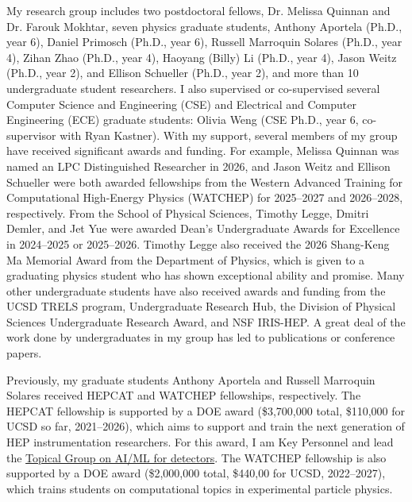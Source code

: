 \documentclass[11pt,letterpaper,notitlepage]{article}
\newcommand{\mycite}[1]{%
\ifthenelse{\equal{#1}{Khachatryan:2015pwa}}{\href{https://doi.org/10.1103/PhysRevD.91.052018}{\textbf{A.I.277}}}{}%
\ifthenelse{\equal{#1}{Anderson:2015tia}}{\href{https://doi.org/10.1016/j.nima.2014.11.041}{\textbf{A.I.311}}}{}%
\ifthenelse{\equal{#1}{Anderson:2015gha}}{\href{https://doi.org/10.1016/j.nima.2015.04.013}{\textbf{A.I.317}}}{}%
\ifthenelse{\equal{#1}{Anderson:2016ygg}}{\href{https://doi.org/10.1109/TNS.2016.2528166}{\textbf{A.I.373}}}{}%
\ifthenelse{\equal{#1}{Anderson:2016tiu}}{\href{https://doi.org/10.1016/j.nima.2015.11.129}{\textbf{A.I.396}}}{}%
\ifthenelse{\equal{#1}{Khachatryan:2016epu}}{\href{https://doi.org/10.1103/PhysRevD.95.012003}{\textbf{A.I.444}}}{}%
\ifthenelse{\equal{#1}{Sirunyan:2016iap}}{\href{https://doi.org/10.1016/j.physletb.2017.02.012}{\textbf{A.I.491}}}{}%
\ifthenelse{\equal{#1}{Sirunyan:2017nvi}}{\href{https://doi.org/10.1007/JHEP01(2018)097}{\textbf{A.I.567}}}{}%
\ifthenelse{\equal{#1}{Sirunyan:2017dgc}}{\href{https://doi.org/10.1103/PhysRevLett.120.071802}{\textbf{A.I.571}}}{}%
\ifthenelse{\equal{#1}{Sirunyan:2017eie}}{\href{https://doi.org/10.1016/j.physletb.2017.12.069}{\textbf{A.I.604}}}{}%
\ifthenelse{\equal{#1}{Duarte:2018ite}}{\href{https://doi.org/10.1088/1748-0221/13/07/P07027}{\textbf{A.I.644}}}{}%
\ifthenelse{\equal{#1}{Sirunyan:2018xlo}}{\href{https://doi.org/10.1007/JHEP08(2018)130}{\textbf{A.I.662}}}{}%
\ifthenelse{\equal{#1}{Sirunyan:2018kst}}{\href{https://doi.org/10.1103/PhysRevLett.121.121801}{\textbf{A.I.667}}}{}%
\ifthenelse{\equal{#1}{Sirunyan:2018ikr}}{\href{https://doi.org/10.1103/PhysRevD.99.012005}{\textbf{A.I.713}}}{}%
\ifthenelse{\equal{#1}{Sirunyan:2018koj}}{\href{https://doi.org/10.1140/epjc/s10052-019-6909-y}{\textbf{A.I.761}}}{}%
\ifthenelse{\equal{#1}{Sirunyan:2018sgc}}{\href{https://doi.org/10.1016/j.physletb.2019.03.059}{\textbf{A.I.762}}}{}%
\ifthenelse{\equal{#1}{Duarte:2019fta}}{\href{https://doi.org/10.1007/s41781-019-0027-2}{\textbf{A.I.794}}}{}%
\ifthenelse{\equal{#1}{Sirunyan:2019vxa}}{\href{https://doi.org/10.1103/PhysRevD.100.112007}{\textbf{A.I.817}}}{}%
\ifthenelse{\equal{#1}{Sirunyan:2019sgo}}{\href{https://doi.org/10.1103/PhysRevLett.123.231803}{\textbf{A.I.818}}}{}%
\ifthenelse{\equal{#1}{Moreno:2019bmu}}{\href{https://doi.org/10.1140/epjc/s10052-020-7608-4}{\textbf{A.I.824}}}{}%
\ifthenelse{\equal{#1}{Summers:2020xiy}}{\href{https://doi.org/10.1088/1748-0221/15/05/p05026}{\textbf{A.I.861}}}{}%
\ifthenelse{\equal{#1}{Sirunyan:2019vgj}}{\href{https://doi.org/10.1007/JHEP05(2020)033}{\textbf{A.I.866}}}{}%
\ifthenelse{\equal{#1}{Sirunyan:2019pnb}}{\href{https://doi.org/10.1016/j.physletb.2020.135448}{\textbf{A.I.875}}}{}%
\ifthenelse{\equal{#1}{Moreno:2019neq}}{\href{https://doi.org/10.1103/PhysRevD.102.012010}{\textbf{A.I.877}}}{}%
\ifthenelse{\equal{#1}{DiGuglielmo:2020eqx}}{\href{https://doi.org/10.1088/2632-2153/aba042}{\textbf{A.I.910}}}{}%
\ifthenelse{\equal{#1}{Sirunyan:2020hwz}}{\href{https://doi.org/10.1007/JHEP12(2020)085}{\textbf{A.I.911}}}{}%
\ifthenelse{\equal{#1}{Iiyama:2020wap}}{\href{https://doi.org/10.3389/fdata.2020.598927}{\textbf{A.I.915}}}{}%
\ifthenelse{\equal{#1}{Krupa:2020bwg}}{\href{https://doi.org/10.1088/2632-2153/abec21}{\textbf{A.I.930}}}{}%
\ifthenelse{\equal{#1}{Pata:2021oez}}{\href{https://doi.org/10.1140/epjc/s10052-021-09158-w}{\textbf{A.I.939}}}{}%
\ifthenelse{\equal{#1}{Aarrestad:2021zos}}{\href{https://doi.org/10.1088/2632-2153/ac0ea1}{\textbf{A.I.944}}}{}%
\ifthenelse{\equal{#1}{Hawks:2021ruw}}{\href{https://doi.org/10.3389/frai.2021.676564}{\textbf{A.I.948}}}{}%
\ifthenelse{\equal{#1}{DiGuglielmo:2021ide}}{\href{https://doi.org/10.1109/TNS.2021.3087100}{\textbf{A.I.951}}}{}%
\ifthenelse{\equal{#1}{John:2020sak}}{\href{https://doi.org/10.1103/PhysRevAccelBeams.24.104601}{\textbf{A.I.971}}}{}%
\ifthenelse{\equal{#1}{Dezoort:2021kfk}}{\href{https://doi.org/10.1007/s41781-021-00073-z}{\textbf{A.I.974}}}{}%
\ifthenelse{\equal{#1}{Zlokapa:2019tkn}}{\href{https://doi.org/10.1007/s42484-021-00054-w}{\textbf{A.I.975}}}{}%
\ifthenelse{\equal{#1}{CMS:2021juv}}{\href{https://doi.org/10.1103/PhysRevLett.127.261804}{\textbf{A.I.987}}}{}%
\ifthenelse{\equal{#1}{Kasieczka:2021xcg}}{\href{https://doi.org/10.1088/1361-6633/ac36b9}{\textbf{A.I.988}}}{}%
\ifthenelse{\equal{#1}{Aarrestad:2021oeb}}{\href{https://doi.org/10.21468/SciPostPhys.12.1.043}{\textbf{A.I.992}}}{}%
\ifthenelse{\equal{#1}{Chen:2021euv}}{\href{https://doi.org/10.1038/s41597-021-01109-0}{\textbf{A.I.993}}}{}%
\ifthenelse{\equal{#1}{Govorkova:2021utb}}{\href{https://doi.org/10.1038/s42256-022-00441-3}{\textbf{A.I.994}}}{}%
\ifthenelse{\equal{#1}{Jawahar:2021vyu}}{\href{https://doi.org/10.3389/fdata.2022.803685}{\textbf{A.I.996}}}{}%
\ifthenelse{\equal{#1}{Elabd:2021lgo}}{\href{https://doi.org/10.3389/fdata.2022.828666}{\textbf{A.I.1004}}}{}%
\ifthenelse{\equal{#1}{CMS:2021yhb}}{\href{https://doi.org/10.1007/JHEP03(2022)160}{\textbf{A.I.1006}}}{}%
\ifthenelse{\equal{#1}{CMS:2022nmn}}{\href{https://doi.org/10.1103/PhysRevLett.131.041803}{\textbf{A.I.1028}}}{}%
\ifthenelse{\equal{#1}{CMS:2022dwd}}{\href{https://doi.org/10.1038/s41586-022-04892-x}{\textbf{A.I.1029}}}{}%
\ifthenelse{\equal{#1}{Touranakou:2022qrp}}{\href{https://doi.org/10.1088/2632-2153/ac7c56}{\textbf{A.I.1030}}}{}%
\ifthenelse{\equal{#1}{Kansal:2022spb}}{\href{https://doi.org/10.1103/PhysRevD.107.076017}{\textbf{A.I.1046}}}{}%
\ifthenelse{\equal{#1}{Bhimij:2022xyn}}{\href{https://doi.org/10.1007/s41781-023-00097-7}{\textbf{A.I.1047}}}{}%
\ifthenelse{\equal{#1}{Hao:2022zns}}{\href{https://doi.org/10.1140/epjc/s10052-023-11633-5}{\textbf{A.I.1052}}}{}%
\ifthenelse{\equal{#1}{Huerta:2022kgj}}{\href{https://doi.org/10.1038/s41597-023-02298-6}{\textbf{A.I.1057}}}{}%
\ifthenelse{\equal{#1}{CMS:2022wqf}}{\href{https://doi.org/10.1103/PhysRevLett.131.041801}{\textbf{A.I.1073}}}{}%
\ifthenelse{\equal{#1}{CMS:2022wjc}}{\href{https://doi.org/10.1007/JHEP07(2023)210}{\textbf{A.I.1078}}}{}%
\ifthenelse{\equal{#1}{Kansal:2023joss}}{\href{https://doi.org/10.21105/joss.05789}{\textbf{A.I.1112}}}{}%
\ifthenelse{\equal{#1}{Orzari:2023zrh}}{\href{https://doi.org/10.1088/2632-2153/ad04ea}{\textbf{A.I.1113}}}{}%
\ifthenelse{\equal{#1}{Shenoy:2023ros}}{\href{https://doi.org/10.1088/2632-2153/ad1139}{\textbf{A.I.1126}}}{}%
\ifthenelse{\equal{#1}{Duarte:2022job}}{\href{https://doi.org/10.1088/2632-2153/ad12e3}{\textbf{A.I.1127}}}{}%
\ifthenelse{\equal{#1}{Weng:2023tailor}}{\href{https://doi.org/10.1145/3624990}{\textbf{A.I.1140}}}{}%
\ifthenelse{\equal{#1}{Black:2022cth}}{\href{https://doi.org/10.1088/1748-0221/19/02/T02015}{\textbf{A.I.1142}}}{}%
\ifthenelse{\equal{#1}{CMS:2024twn}}{\href{https://doi.org/10.1007/s41781-024-00124-1}{\textbf{A.I.1144}}}{}%
\ifthenelse{\equal{#1}{CMS:2024bvl}}{\href{https://doi.org/10.1103/PhysRevD.110.032007}{\textbf{A.I.1145}}}{}%
\ifthenelse{\equal{#1}{Pata:2023rhh}}{\href{https://doi.org/10.1038/s42005-024-01599-5}{\textbf{A.I.1155}}}{}%
\ifthenelse{\equal{#1}{Campos:2023pkp}}{\href{https://doi.org/10.1145/3662000}{\textbf{A.I.1168}}}{}%
\ifthenelse{\equal{#1}{Weng:2024fkeras}}{\href{https://doi.org/10.1145/3665334}{\textbf{A.I.1178}}}{}%
\ifthenelse{\equal{#1}{CMS:2024ake}}{\href{https://doi.org/10.1103/PhysRevD.110.012004}{\textbf{A.I.1181}}}{}%
\ifthenelse{\equal{#1}{Odagiu:2024bkp}}{\href{https://doi.org/10.1088/2632-2153/ad5f10}{\textbf{A.I.1183}}}{}%
\ifthenelse{\equal{#1}{Brigljevic:2024vuv}}{\href{https://doi.org/10.1140/epjc/s10052-024-13376-3}{\textbf{A.I.1222}}}{}%
\ifthenelse{\equal{#1}{CMS:2024ddc}}{\href{https://doi.org/10.1007/JHEP12(2024)035}{\textbf{A.I.1229}}}{}%
\ifthenelse{\equal{#1}{CMS:2024zqs}}{\href{https://doi.org/10.1016/j.physrep.2024.09.013}{\textbf{A.I.1260}}}{}%
\ifthenelse{\equal{#1}{CMS:2024zhe}}{\href{https://doi.org/10.1016/j.physrep.2024.09.006}{\textbf{A.I.1262}}}{}%
\ifthenelse{\equal{#1}{Mokhtar:2025zqs}}{\href{https://doi.org/10.1103/PhysRevD.111.092015}{\textbf{A.I.1276}}}{}%
\ifthenelse{\equal{#1}{Zhao:2025daw}}{\href{https://doi.org/10.1088/1748-0221/20/06/P06002}{\textbf{A.I.1286}}}{}%
\ifthenelse{\equal{#1}{Weitz:2025tcj}}{\href{https://doi.org/10.1088/2632-2153/adede1}{\textbf{A.I.1288}}}{}%
\ifthenelse{\equal{#1}{Tsoi:2024pbn}}{\href{https://doi.org/10.1007/s41781-025-00140-9}{\textbf{A.I.1293}}}{}%
\ifthenelse{\equal{#1}{Li:2024qfq}}{\href{https://doi.org/10.1007/JHEP11(2025)119}{\textbf{A.I.1321}}}{}%
\ifthenelse{\equal{#1}{CMS:2025rtd}}{\href{https://doi.org/10.1103/7ldn-snzn}{\textbf{A.I.1337}}}{}%
\ifthenelse{\equal{#1}{CMS:2026znb}}{\href{https://arxiv.org/abs/2601.17554}{\textbf{A.I.1352}}}{}%
\ifthenelse{\equal{#1}{Schulte:2025mai}}{\href{https://doi.org/10.1145/3801979}{\textbf{A.I.1365}}}{}%
\ifthenelse{\equal{#1}{Hawks:2025hew}}{\href{https://doi.org/10.1145/3787490}{\textbf{A.I.1375}}}{}%
\ifthenelse{\equal{#1}{CMS:2026shw}}{\href{https://arxiv.org/abs/2602.00273}{\textbf{A.I.1377}}}{}%
\ifthenelse{\equal{#1}{Deiana:2021niw}}{\href{https://doi.org/10.3389/fdata.2022.787421}{\textbf{A.II.1}}}{}%
\ifthenelse{\equal{#1}{Duarte:2022efficient}}{\href{https://doi.org/10.3389/frai.2022.999173}{\textbf{A.II.2}}}{}%
\ifthenelse{\equal{#1}{Chien:2024gnn}}{\href{https://doi.org/10.1038/s44287-024-00076-z}{\textbf{A.II.3}}}{}%
\ifthenelse{\equal{#1}{Duarte:2025qbk}}{\href{https://doi.org/10.1142/S0217751X26300115}{\textbf{A.II.4}}}{}%
\ifthenelse{\equal{#1}{Duarte:2020ngm}}{\href{https://doi.org/10.1142/9789811234033_0012}{\textbf{A.III.1}}}{}%
\ifthenelse{\equal{#1}{Duarte:2024xkc}}{\href{https://doi.org/10.1142/9789819801107_0005}{\textbf{A.III.2}}}{}%
\ifthenelse{\equal{#1}{neurips2019_sonic}}{\href{https://doi.org/10.5281/zenodo.3895029}{\textbf{A.IV.1}}}{}%
\ifthenelse{\equal{#1}{neurips2019_hbb}}{\href{https://doi.org/10.5281/zenodo.3895048}{\textbf{A.IV.2}}}{}%
\ifthenelse{\equal{#1}{neurips2019_hls4ml}}{\href{https://doi.org/10.5281/zenodo.3895081}{\textbf{A.IV.3}}}{}%
\ifthenelse{\equal{#1}{Rankin:2020usv}}{\href{https://doi.org/10.1109/H2RC51942.2020.00010}{\textbf{A.IV.4}}}{}%
\ifthenelse{\equal{#1}{Heintz:2020soy}}{\href{https://arxiv.org/abs/2012.01563}{\textbf{A.IV.5}}}{}%
\ifthenelse{\equal{#1}{Kansal:2020svm}}{\href{https://arxiv.org/abs/2012.00173}{\textbf{A.IV.6}}}{}%
\ifthenelse{\equal{#1}{Fahim:2021cic}}{\href{https://arxiv.org/abs/2103.05579}{\textbf{A.IV.7}}}{}%
\ifthenelse{\equal{#1}{Orzari:2021suh}}{\href{https://arxiv.org/abs/2109.15197}{\textbf{A.IV.8}}}{}%
\ifthenelse{\equal{#1}{Mokhtar:2021bkf}}{\href{https://arxiv.org/abs/2111.12840}{\textbf{A.IV.9}}}{}%
\ifthenelse{\equal{#1}{Banbury:2021mlperf}}{\href{https://arxiv.org/abs/2106.07597}{\textbf{A.IV.10}}}{}%
\ifthenelse{\equal{#1}{Kansal:2021cqp}}{\href{https://arxiv.org/abs/2106.11535}{\textbf{A.IV.11}}}{}%
\ifthenelse{\equal{#1}{Tsan:2021brw}}{\href{https://arxiv.org/abs/2111.12849}{\textbf{A.IV.12}}}{}%
\ifthenelse{\equal{#1}{Pata:2022wam}}{\href{https://doi.org/10.1088/1742-6596/2438/1/012100}{\textbf{A.IV.13}}}{}%
\ifthenelse{\equal{#1}{Borras:2022opensource}}{\href{https://arxiv.org/abs/2206.11791}{\textbf{A.IV.14}}}{}%
\ifthenelse{\equal{#1}{Pappalardo:2022nxk}}{\href{https://arxiv.org/abs/2206.07527}{\textbf{A.IV.15}}}{}%
\ifthenelse{\equal{#1}{Duarte:2022hdp}}{\href{https://arxiv.org/abs/2207.07958}{\textbf{A.IV.16}}}{}%
\ifthenelse{\equal{#1}{Mokhtar:2022pwm}}{\href{https://arxiv.org/abs/2211.09912}{\textbf{A.IV.17}}}{}%
\ifthenelse{\equal{#1}{Hussain:2022faststamp}}{\href{https://doi.org/10.1145/3508352.3549357}{\textbf{A.IV.18}}}{}%
\ifthenelse{\equal{#1}{McDermott:2023neural}}{\href{https://arxiv.org/abs/2312.05978}{\textbf{A.IV.19}}}{}%
\ifthenelse{\equal{#1}{Mokhtar:2023fzl}}{\href{https://doi.org/10.1088/1742-6596/3206/1/012099}{\textbf{A.IV.20}}}{}%
\ifthenelse{\equal{#1}{Huang:2023bny}}{\href{https://doi.org/10.1109/FPL60245.2023.00050}{\textbf{A.IV.21}}}{}%
\ifthenelse{\equal{#1}{Amaro:2023voyager}}{\href{https://doi.org/10.1145/3569951.3597597}{\textbf{A.IV.22}}}{}%
\ifthenelse{\equal{#1}{Li:2023xhj}}{\href{https://arxiv.org/abs/2312.04757}{\textbf{A.IV.23}}}{}%
\ifthenelse{\equal{#1}{Miao:2024oqy}}{\href{https://arxiv.org/abs/2402.12535}{\textbf{A.IV.24}}}{}%
\ifthenelse{\equal{#1}{Baldi:2024reliable}}{\href{https://doi.org/10.1109/VTS60656.2024.10538639}{\textbf{A.IV.25}}}{}%
\ifthenelse{\equal{#1}{Zhao:2024kry}}{\href{https://arxiv.org/abs/2408.09343}{\textbf{A.IV.26}}}{}%
\ifthenelse{\equal{#1}{Bhatnagar:2024fkx}}{\href{https://arxiv.org/abs/2412.03673}{\textbf{A.IV.27}}}{}%
\ifthenelse{\equal{#1}{Katel:2024ygn}}{\href{https://arxiv.org/abs/2412.05333}{\textbf{A.IV.28}}}{}%
\ifthenelse{\equal{#1}{Weng:2025amigolut}}{\href{https://doi.org/10.1145/3706628.3708874}{\textbf{A.IV.29}}}{}%
\ifthenelse{\equal{#1}{Kondratyev:2025jfj}}{\href{https://doi.org/10.1145/3708035.3736049}{\textbf{A.IV.30}}}{}%
\ifthenelse{\equal{#1}{Hao:2025abk}}{\href{https://arxiv.org/abs/2509.07486}{\textbf{A.IV.31}}}{}%
\ifthenelse{\equal{#1}{Govil:2025nvy}}{\href{https://arxiv.org/abs/2510.07594}{\textbf{A.IV.32}}}{}%
\ifthenelse{\equal{#1}{Legge:2025cnm}}{\href{https://arxiv.org/abs/2512.00210}{\textbf{A.IV.33}}}{}%
\ifthenelse{\equal{#1}{Weitz:2025dia}}{\href{https://arxiv.org/abs/2512.15998}{\textbf{A.IV.34}}}{}%
\ifthenelse{\equal{#1}{Weitz:2026xsv}}{\href{https://arxiv.org/abs/2605.16138}{\textbf{A.IV.35}}}{}%
\ifthenelse{\equal{#1}{Duarte:2014soa}}{\href{https://arxiv.org/abs/1409.4466}{\textbf{B.I.1}}}{}%
\ifthenelse{\equal{#1}{Bornheim_2015}}{\href{https://doi.org/10.1088/1742-6596/587/1/012057}{\textbf{B.I.2}}}{}%
\ifthenelse{\equal{#1}{7581887}}{\href{https://doi.org/10.1109/NSSMIC.2015.7581887}{\textbf{B.I.3}}}{}%
\ifthenelse{\equal{#1}{Duarte:2016wnw}}{\href{https://doi.org/10.1016/j.nuclphysbps.2015.09.071}{\textbf{B.I.4}}}{}%
\ifthenelse{\equal{#1}{8069874}}{\href{https://doi.org/10.1109/NSSMIC.2016.8069874}{\textbf{B.I.5}}}{}%
\ifthenelse{\equal{#1}{Bornheim:2017gql}}{\href{https://doi.org/10.1088/1742-6596/928/1/012023}{\textbf{B.I.6}}}{}%
\ifthenelse{\equal{#1}{Duarte:2018bsd}}{\href{https://arxiv.org/abs/1808.00902}{\textbf{B.I.7}}}{}%
\ifthenelse{\equal{#1}{Albertsson:2018maf}}{\href{https://doi.org/10.1088/1742-6596/1085/2/022008}{\textbf{B.I.8}}}{}%
\ifthenelse{\equal{#1}{Aarrestad:2020ngo}}{\href{https://doi.org/10.5281/zenodo.4009114}{\textbf{B.I.9}}}{}%
\ifthenelse{\equal{#1}{Wozniak:2020}}{\href{https://doi.org/10.1051/epjconf/202024506039}{\textbf{B.I.10}}}{}%
\ifthenelse{\equal{#1}{Thais:2022iok}}{\href{https://arxiv.org/abs/2203.12852}{\textbf{B.I.11}}}{}%
\ifthenelse{\equal{#1}{Harris:2022qtm}}{\href{https://arxiv.org/abs/2203.16255}{\textbf{B.I.12}}}{}%
\ifthenelse{\equal{#1}{Apresyan:2022tqw}}{\href{https://arxiv.org/abs/2203.07353}{\textbf{B.I.13}}}{}%
\ifthenelse{\equal{#1}{Benelli:2022sqn}}{\href{https://arxiv.org/abs/2207.09060}{\textbf{B.I.14}}}{}%
\ifthenelse{\equal{#1}{Dawson:2022zbb}}{\href{https://arxiv.org/abs/2209.07510}{\textbf{B.I.15}}}{}%
\ifthenelse{\equal{#1}{Shanahan:2022ifi}}{\href{https://arxiv.org/abs/2209.07559}{\textbf{B.I.16}}}{}%
\ifthenelse{\equal{#1}{Agarwal:2023rwr}}{\href{https://arxiv.org/abs/2306.08106}{\textbf{B.I.17}}}{}%
\ifthenelse{\equal{#1}{Li:2024xpw}}{\href{https://doi.org/10.1051/epjconf/202429509017}{\textbf{B.I.18}}}{}%
\ifthenelse{\equal{#1}{Duarte:2024lsg}}{\href{https://doi.org/10.22323/1.476.0012}{\textbf{B.I.19}}}{}%
\ifthenelse{\equal{#1}{Duarte:2017bbq}}{\href{https://arxiv.org/abs/1703.06544}{\textbf{B.IV.1}}}{}%
\ifthenelse{\equal{#1}{CMS-DP-2018-046}}{\href{https://cds.cern.ch/record/2630438}{\textbf{B.IV.2}}}{}%
\ifthenelse{\equal{#1}{CMS-PAS-EXO-17-026}}{\href{https://cds.cern.ch/record/2637847}{\textbf{B.IV.3}}}{}%
\ifthenelse{\equal{#1}{CERN-LHCC-2020-004}}{\href{https://cds.cern.ch/record/2714892}{\textbf{B.IV.4}}}{}%
\ifthenelse{\equal{#1}{hls4ml}}{\href{https://doi.org/10.5281/zenodo.1201549}{\textbf{B.IV.5}}}{}%
\ifthenelse{\equal{#1}{CMS-DP-2021-030}}{\href{https://cds.cern.ch/record/2792320}{\textbf{B.IV.6}}}{}%
\ifthenelse{\equal{#1}{CMS-PAS-HIG-21-012}}{\href{https://cds.cern.ch/record/2809929}{\textbf{B.IV.7}}}{}%
\ifthenelse{\equal{#1}{CMS-DP-2022-041}}{\href{https://cds.cern.ch/record/2839736}{\textbf{B.IV.8}}}{}%
\ifthenelse{\equal{#1}{CMS-DP-2022-061}}{\href{https://cds.cern.ch/record/2842375}{\textbf{B.IV.9}}}{}%
\ifthenelse{\equal{#1}{CMS-DP-2023-037}}{\href{https://cds.cern.ch/record/2863316}{\textbf{B.IV.10}}}{}%
\ifthenelse{\equal{#1}{CMS-PAS-HIG-21-020}}{\href{https://cds.cern.ch/record/2866501}{\textbf{B.IV.11}}}{}%
\ifthenelse{\equal{#1}{CMS-DP-2023-079}}{\href{https://cds.cern.ch/record/2876546}{\textbf{B.IV.12}}}{}%
\ifthenelse{\equal{#1}{Weng:2024architectural}}{\href{https://arxiv.org/abs/2403.08980}{\textbf{B.IV.13}}}{}%
\ifthenelse{\equal{#1}{CMS-PAS-HIG-23-012}}{\href{https://cds.cern.ch/record/2904879}{\textbf{B.IV.14}}}{}%
\ifthenelse{\equal{#1}{CMS-PAS-EXO-24-007}}{\href{https://cds.cern.ch/record/2904945}{\textbf{B.IV.15}}}{}%
\ifthenelse{\equal{#1}{CMS-DP-2024-059}}{\href{https://cds.cern.ch/record/2904695}{\textbf{B.IV.16}}}{}%
\ifthenelse{\equal{#1}{Li:2024htp}}{\href{https://arxiv.org/abs/2405.12972}{\textbf{B.IV.17}}}{}%
\ifthenelse{\equal{#1}{CMS-DP-2025-033}}{\href{https://cds.cern.ch/record/2937578}{\textbf{B.IV.18}}}{}%
\ifthenelse{\equal{#1}{CMS-DP-2025-061}}{\href{https://cds.cern.ch/record/2942560}{\textbf{B.IV.19}}}{}%
\ifthenelse{\equal{#1}{Wang:2025dky}}{\href{https://arxiv.org/abs/2510.23641}{\textbf{B.IV.20}}}{}%
\ifthenelse{\equal{#1}{Wang:2026lqb}}{\href{https://arxiv.org/abs/2605.21789}{\textbf{B.IV.21}}}{}%
\ifthenelse{\equal{#1}{CMS:2025ngq}}{\href{https://arxiv.org/abs/2510.07527}{\textbf{C.1}}}{}%
\ifthenelse{\equal{#1}{Gonski:2026jgu}}{\href{https://arxiv.org/abs/2602.22248}{\textbf{C.2}}}{}%
\ifthenelse{\equal{#1}{CMS:2026yrb}}{\href{https://arxiv.org/abs/2603.22233}{\textbf{C.3}}}{}%
\ifthenelse{\equal{#1}{CMS:2026yvw}}{\href{https://arxiv.org/abs/2603.21965}{\textbf{C.4}}}{}%
\ifthenelse{\equal{#1}{CMS:2026znu}}{\href{https://arxiv.org/abs/2604.27044}{\textbf{C.5}}}{}%
\ifthenelse{\equal{#1}{CMS:2026uph}}{\href{https://arxiv.org/abs/2604.09809}{\textbf{C.6}}}{}%
\ifthenelse{\equal{#1}{Miao:2026yvl}}{\href{https://arxiv.org/abs/2606.20437}{\textbf{C.7}}}{}%
\ifthenelse{\equal{#1}{Mokhtar:2026gdb}}{\href{https://arxiv.org/abs/2606.14373}{\textbf{C.8}}}{}%
\ifthenelse{\equal{#1}{CMS-PAS-HIG-24-012}}{\href{https://arxiv.org/abs/2607.05145}{\textbf{C.9}}}{}%
}
\begin{document}
My research group includes two postdoctoral fellows, Dr. Melissa Quinnan and Dr. Farouk Mokhtar, seven physics graduate students, Anthony Aportela (Ph.D., year 6), Daniel Primosch (Ph.D., year 6), Russell Marroquin Solares (Ph.D., year 4), Zihan Zhao (Ph.D., year 4), Haoyang (Billy) Li (Ph.D., year 4), Jason Weitz (Ph.D., year 2), and Ellison Schueller (Ph.D., year 2), and more than 10 undergraduate student researchers.
I also supervised or co-supervised several Computer Science and Engineering (CSE) and Electrical and Computer Engineering (ECE) graduate students: Olivia Weng (CSE Ph.D., year 6, co-supervisor with Ryan Kastner).
With my support, several members of my group have received significant awards and funding.
For example, Melissa Quinnan was named an LPC Distinguished Researcher in 2026, and Jason Weitz and Ellison Schueller were both awarded fellowships from the Western Advanced Training for Computational High-Energy Physics (WATCHEP) for 2025--2027 and 2026--2028, respectively.
From the School of Physical Sciences, Timothy Legge, Dmitri Demler, and Jet Yue were awarded Dean's Undergraduate Awards for Excellence in 2024--2025 or 2025--2026.
Timothy Legge also received the 2026 Shang-Keng Ma Memorial Award from the Department of Physics, which is given to a graduating physics student who has shown exceptional ability and promise.
Many other undergraduate students have also received awards and funding from the UCSD TRELS program, Undergraduate Research Hub, the Division of Physical Sciences Undergraduate Research Award, and NSF IRIS-HEP.
A great deal of the work done by undergraduates in my group has led to publications or conference papers.

Previously, my graduate students Anthony Aportela and Russell Marroquin Solares received HEPCAT and WATCHEP fellowships, respectively.
The HEPCAT fellowship is supported by a DOE award (\$3,700,000 total, \$110,000 for UCSD so far, 2021--2026), which aims to support and train the next generation of HEP instrumentation researchers.
For this award, I am Key Personnel and lead the \href{https://hepcat.ucsd.edu/topical-groups/tg7-ai-ml-for-detectors-2/}{Topical Group on AI/ML for detectors}.
The WATCHEP fellowship is also supported by a DOE award (\$2,000,000 total, \$440,00 for UCSD, 2022--2027), which trains students on computational topics in experimental particle physics.
\end{document}
